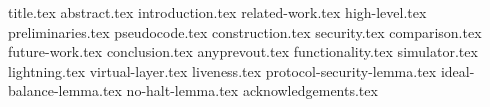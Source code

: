 \documentclass[sigconf]{acmart}
\begin{document}
\pagestyle{plain}

{title.tex}
{abstract.tex}
{introduction.tex}
{related-work.tex}
{high-level.tex}
{preliminaries.tex}
{pseudocode.tex}
{construction.tex}
{security.tex}
{comparison.tex}
{future-work.tex}
{conclusion.tex}
{anyprevout.tex}
{functionality.tex}
{simulator.tex}
{lightning.tex}
{virtual-layer.tex}
{liveness.tex}
{protocol-security-lemma.tex}
{ideal-balance-lemma.tex}
{no-halt-lemma.tex}
{acknowledgements.tex}


\end{document}
